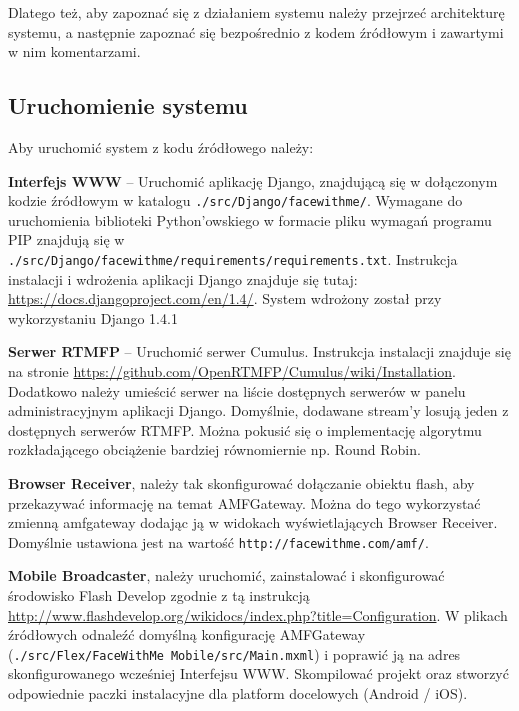 Dlatego też, aby zapoznać się z działaniem systemu należy przejrzeć architekturę systemu, a następnie zapoznać się bezpośrednio z kodem źródłowym i zawartymi w nim komentarzami.

\subsection{Uruchomienie systemu}

Aby uruchomić system z kodu źródłowego należy:

\begin{packed_item}
    \item{\textbf{Interfejs WWW} -- Uruchomić aplikację Django, znajdującą się w dołączonym kodzie źródłowym w katalogu \texttt{./src/Django/facewithme/}. Wymagane do uruchomienia biblioteki Python'owskiego w formacie pliku wymagań programu PIP znajdują się w \texttt{./src/Django/facewithme/requirements/requirements.txt}. Instrukcja instalacji i wdrożenia aplikacji Django znajduje się tutaj: \url{https://docs.djangoproject.com/en/1.4/}. System wdrożony został przy wykorzystaniu Django 1.4.1}
    \item{\textbf{Serwer RTMFP} -- Uruchomić serwer  Cumulus. Instrukcja instalacji znajduje się na stronie \url{https://github.com/OpenRTMFP/Cumulus/wiki/Installation}. Dodatkowo należy umieścić serwer na liście dostępnych serwerów w panelu administracyjnym aplikacji Django. Domyślnie, dodawane stream'y losują jeden z dostępnych serwerów RTMFP. Można pokusić się o implementację algorytmu rozkładającego obciążenie bardziej równomiernie np. Round Robin.}
    \item{\textbf{Browser Receiver}, należy tak skonfigurować dołączanie obiektu flash, aby przekazywać informację na temat AMFGateway. Można do tego wykorzystać zmienną amfgateway dodając ją w widokach wyświetlających Browser Receiver. Domyślnie ustawiona jest na wartość \texttt{http://facewithme.com/amf/}.}
    \item{\textbf{Mobile Broadcaster}, należy uruchomić, zainstalować i skonfigurować środowisko Flash Develop zgodnie z tą instrukcją \url{http://www.flashdevelop.org/wikidocs/index.php?title=Configuration}. W plikach źródłowych odnaleźć domyślną konfigurację AMFGateway (\texttt{./src/Flex/FaceWithMe Mobile/src/Main.mxml}) i poprawić ją na adres skonfigurowanego wcześniej Interfejsu WWW. Skompilować projekt oraz stworzyć odpowiednie paczki instalacyjne dla platform docelowych (Android / iOS).}
\end{packed_item}

